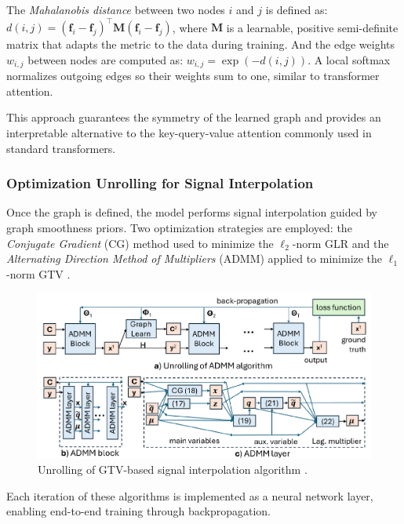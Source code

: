 \documentclass{article}
\theoremstyle{plain}
\theoremstyle{definition}
\theoremstyle{remark}
\begin{document}
The \textit{Mahalanobis distance} between two nodes $i$ and $j$ is defined as: $d(i, j) = (\mathbf{f}_i - \mathbf{f}_j)^\top \mathbf{M} (\mathbf{f}_i - \mathbf{f}_j)$, where $\mathbf{M}$ is a learnable, positive semi-definite matrix that adapts the metric to the data during training. And the edge weights $w_{i,j}$ between nodes are computed as: $w_{i,j} = \exp(-d(i,j)).$ A local softmax normalizes outgoing edges so their weights sum to one, similar to transformer attention.

This approach guarantees the symmetry of the learned graph and provides an interpretable alternative to the key-query-value attention commonly used in standard transformers.

\subsubsection{Optimization Unrolling for Signal Interpolation}

Once the graph is defined, the model performs signal interpolation guided by graph smoothness priors. Two optimization strategies are employed: the \textit{Conjugate Gradient} (CG) method used to minimize the $\ell_2$-norm GLR \cite{shewchuk1994introduction} and the \textit{Alternating Direction Method of Multipliers} (ADMM) applied to minimize the $\ell_1$-norm GTV \cite{wang2017new}.

\begin{figure}[ht]
\vskip -0.1in
\begin{center}
\centerline{\includegraphics[width=0.9\columnwidth]{GTV-based_algorithm.png}}
\caption{Unrolling of GTV-based signal interpolation algorithm \cite{do2024interpretable}.}
\label{fig:unrolling-gtv}
\end{center}
\vskip -0.3in
\end{figure}

Each iteration of these algorithms is implemented as a neural network layer, enabling end-to-end training through backpropagation.
\end{document}
